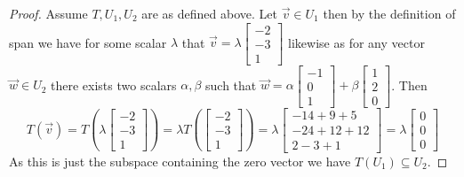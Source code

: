 \documentclass[letter,12pt]{article}
\begin{document}
\begin{proof}

  Assume $T,U_1,U_2$ are as defined above. Let $\vec{v}\in U_1$ then by the definition of span we have for some scalar $\lambda$ that $\vec{v}=\lambda \begin{bmatrix} -2 \\ -3 \\ 1 \end{bmatrix}$ likewise as for any vector $\vec w\in U_2$ there exists two scalars $\alpha,\beta$ such that $\vec w= \alpha \begin{bmatrix} - 1 \\ 0 \\ 1 \end{bmatrix} + \beta \begin{bmatrix}1 \\ 2 \\ 0 \end{bmatrix} $. Then 
  \[
    T(\vec{v})= T\left(\lambda \begin{bmatrix} -2 \\ -3 \\ 1 \end{bmatrix}\right)= \lambda T\left(\begin{bmatrix} -2 \\ -3 \\ 1 \end{bmatrix}\right)=\lambda \begin{bmatrix} -14+9+5 \\ -24+12+12 \\ 2 -3 + 1 \end{bmatrix}=\lambda \begin{bmatrix}
      0\\0\\0
    \end{bmatrix}
  \] 
  As this is just the subspace containing the zero vector we have $T(U_1)\subseteq U_2$.


\end{proof}
\end{document}
